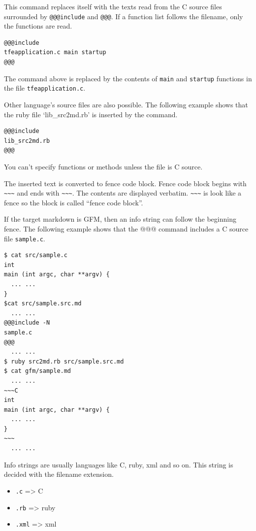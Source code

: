 This command replaces itself with the texts read from the C source files
surrounded by \texttt{@@@include} and \texttt{@@@}. If a function list
follows the filename, only the functions are read.

\begin{verbatim}
@@@include
tfeapplication.c main startup
@@@
\end{verbatim}

The command above is replaced by the contents of \texttt{main} and
\texttt{startup} functions in the file \texttt{tfeapplication.c}.

Other language's source files are also possible. The following example
shows that the ruby file `lib\_src2md.rb' is inserted by the command.

\begin{verbatim}
@@@include
lib_src2md.rb
@@@
\end{verbatim}

You can't specify functions or methods unless the file is C source.

The inserted text is converted to fence code block. Fence code block
begins with \texttt{\textasciitilde{}\textasciitilde{}\textasciitilde{}}
and ends with
\texttt{\textasciitilde{}\textasciitilde{}\textasciitilde{}}. The
contents are displayed verbatim.
\texttt{\textasciitilde{}\textasciitilde{}\textasciitilde{}} is look
like a fence so the block is called ``fence code block''.

If the target markdown is GFM, then an info string can follow the
beginning fence. The following example shows that the @@@ command
includes a C source file \texttt{sample.c}.

\begin{verbatim}
$ cat src/sample.c
int
main (int argc, char **argv) {
  ... ...
}
$cat src/sample.src.md
  ... ...
@@@include -N
sample.c
@@@
  ... ...
$ ruby src2md.rb src/sample.src.md
$ cat gfm/sample.md
  ... ...
~~~C
int
main (int argc, char **argv) {
  ... ...
}
~~~
  ... ...
\end{verbatim}

Info strings are usually languages like C, ruby, xml and so on. This
string is decided with the filename extension.

\begin{itemize}
\tightlist
\item
  \texttt{.c} =\textgreater{} C
\item
  \texttt{.rb} =\textgreater{} ruby
\item
  \texttt{.xml} =\textgreater{} xml
\end{itemize}

